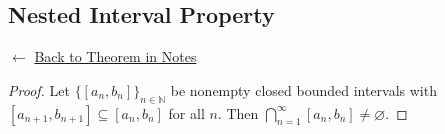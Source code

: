
\subsection*{Nested Interval Property}
\label{prf:nested-interval-property}

\begin{remark*}[Return]
$\leftarrow$ \hyperref[thm:nested-interval-property]{Back to Theorem in Notes}
\end{remark*}

\begin{proof}
\Claim Let $\{[a_n, b_n]\}_{n \in \mathbb{N}}$ be nonempty closed bounded intervals with $[a_{n+1},b_{n+1}] \subseteq [a_n,b_n]$ for all $n$. Then $\bigcap_{n=1}^\infty [a_n,b_n] \neq \varnothing$.

\end{proof}

\begin{remark*}
\end{remark*}

\begin{remark*}[Dependencies]
\end{remark*}
